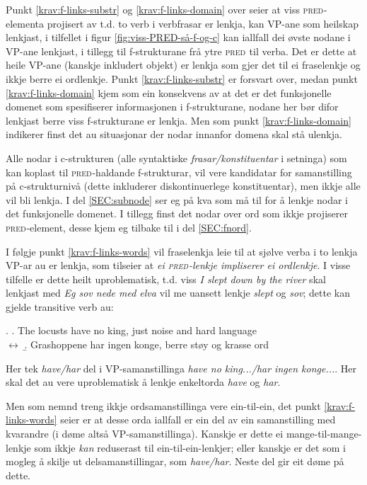\documentclass[12pt,a4paper,oneside,draft]{report}
\newcommand{\F}[2]{\textsc{#1}\ensuremath{_{#2}}}
\newcommand{\PRED}{\F{pred}{}}
\begin{document}
Punkt \ref{krav:f-links-substr} og \ref{krav:f-links-domain} over seier at viss
\PRED{}-elementa projisert av t.d. to verb i verbfrasar er lenkja, kan
VP-ane som heilskap lenkjast, i tilfellet i figur
\ref{fig:viss-PRED-så-f-og-c} kan iallfall dei øvste nodane i VP-ane
lenkjast, i tillegg til f\hyp{}strukturane frå ytre \PRED{} til verba.  Det er
dette at heile VP-ane (kanskje inkludert objekt) er lenkja som gjer
det til ei fraselenkje og ikkje berre ei ordlenkje. Punkt
\ref{krav:f-links-substr} er forsvart over, medan punkt
\ref{krav:f-links-domain} kjem som ein konsekvens av at det er det
funksjonelle domenet som spesifiserer informasjonen i f\hyp{}strukturane,
nodane her bør difor lenkjast berre viss f\hyp{}strukturane er lenkja. Men
som punkt \ref{krav:f-links-domain} indikerer finst det au situasjonar der
nodar innanfor domena skal stå ulenkja.

Alle nodar i c\hyp{}strukturen (alle syntaktiske \emph{frasar/konstituentar} i
setninga) som kan koplast til \PRED{}-haldande f\hyp{}strukturar, vil vere
kandidatar for samanstilling på c\hyp{}strukturnivå (dette inkluderer
diskontinuerlege konstituentar), men ikkje alle vil bli lenkja.  I del
\ref{SEC:subnode} ser eg på kva som må til for å lenkje nodar i det
funksjonelle domenet.  I tillegg finst det nodar over ord som ikkje
projiserer \PRED{}-element, desse kjem eg tilbake til i del
\ref{SEC:fnord}.

I følgje punkt \ref{krav:f-links-words} vil fraselenkja leie til at sjølve
verba i to lenkja VP-ar au er lenkja, som tilseier at \emph{ei \PRED{}-lenkje
impliserer ei ordlenkje}. I visse tilfelle er dette heilt
uproblematisk, t.d. viss \emph{I slept down by the river} skal lenkjast med
\emph{Eg sov nede med elva} vil me uansett lenkje \emph{slept} og \emph{sov}; dette
kan gjelde transitive verb au:

\ex. \a. The locusts have no king, just noise and hard language\\
     $\leftrightarrow$
     \b. Grashoppene har ingen konge, berre støy og krasse ord


Her tek \emph{have/har} del i VP-samanstillinga \emph{have no king.../har
 ingen konge...}. Her skal det au vere uproblematisk å lenkje
 enkeltorda \emph{have} og \emph{har}.

Men som nemnd treng ikkje ordsamanstillinga vere ein-til-ein, det
 punkt \ref{krav:f-links-words} seier er at desse orda iallfall er ein
 del av ein samanstilling med kvarandre (i døme \Last altså
 VP-samanstillinga). Kanskje er dette ei mange-til-mange-lenkje som
 ikkje \emph{kan} reduserast til ein-til-ein-lenkjer; eller kanskje er
 det som i \Last mogleg å skilje ut delsamanstillingar, som
 \emph{have/har}. Neste del gir eit døme på dette.
\end{document}
